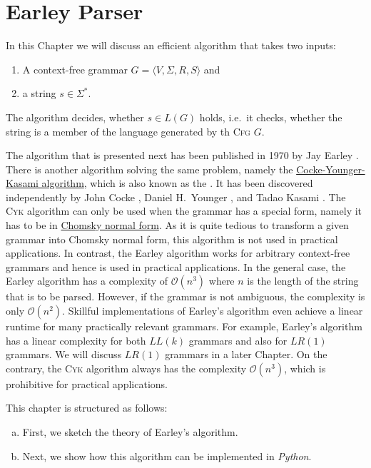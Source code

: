 \chapter{Earley Parser}
In this Chapter we will discuss an efficient algorithm that takes two inputs:
\begin{enumerate}
\item A context-free grammar $G = \langle V, \Sigma, R, S \rangle$ and
\item a string $s \in \Sigma^*$.
\end{enumerate}
The algorithm decides, whether $s \in L(G)$ holds, i.e.~it checks, whether the string is a
member of the language generated by th \textsc{Cfg} $G$.

The algorithm that is presented next has been published in 1970 by Jay Earley \cite{earley:70}.
There is another algorithm solving the same problem, namely the
\href{https://en.wikipedia.org/wiki/CYK_algorithm#:~:text=In%20computer%20science%2C%20the%20Cocke,Tadao%20Kasami%2C%20and%20Jacob%20T.}{Cocke-Younger-Kasami algorithm},
  which is also known as the
.
It has been discovered independently by John Cocke
\cite{cocke:1970}, Daniel H.~Younger \cite{younger:1967}, and Tadao Kasami \cite{kasami:1965}.
The \textsc{Cyk} algorithm can only be used when the grammar has a special form, namely it has to be in
\href{https://en.wikipedia.org/wiki/Chomsky_normal_form}{Chomsky normal form}.
As it is quite tedious to transform a given grammar into Chomsky normal form, this algorithm is not used in
practical applications.
In contrast, the Earley algorithm works for arbitrary context-free grammars and hence is used in practical applications.
In the general case, the Earley algorithm has a complexity of $\mathcal{O}(n^3)$ where $n$ is the length of the
string that is to be parsed.  However, if the grammar is not ambiguous, the complexity is only
$\mathcal{O}(n^2)$.  Skillful implementations of Earley's algorithm even achieve a linear runtime for many
practically relevant grammars.   
For example, Earley's algorithm has a linear complexity for both  $LL(k)$ grammars and also for $LR(1)$
grammars.  We will discuss $LR(1)$ grammars in a later Chapter.  On the contrary, the \textsc{Cyk} algorithm
always has the complexity $\mathcal{O}(n^3)$, which is prohibitive for practical applications.

This chapter is structured as follows:
\begin{enumerate}[(a)]
\item First, we sketch the theory of Earley's algorithm.
\item Next, we show how this algorithm can be implemented in \textsl{Python}.
\end{enumerate}

